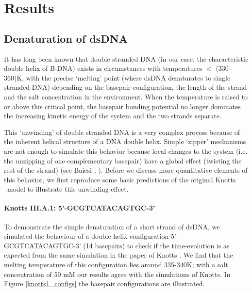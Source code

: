 \section{Results}

\subsection{Denaturation of dsDNA}

It has long been known that double stranded DNA (in our case, the characteristic double helix of B-DNA) exists in circumstances with temperatures $<$ (330--360)K, with the precise `melting' point (where dsDNA denaturates to single stranded DNA) depending on the basepair configuration, the length of the strand and the salt concentration in the environment. When the temperature is raised to or above this critical point, the basepair bonding potential no longer dominates the increasing kinetic energy of the system and the two strands separate. 

This `unwinding' of double stranded DNA is a very complex process because of the inherent helical structure of a DNA double helix. Simple `zipper' mechanisms are not enough to simulate this behavior because local changes to the system (i.e. the unzipping of one complementary basepair) have a global effect (twisting the rest of the strand) (see Baiesi \etal, \cite{carlon2010unwinding}). Before we discuss more quantitative elements of this behavior, we first reproduce some basic predictions of the original Knotts \etal\ model \cite{knotts2007coarse} to illustrate this unwinding effect.

\paragraph{Knotts III.A.1: 5'-GCGTCATACAGTGC-3'} To demonstrate the simple denaturation of a short strand of dsDNA, we simulated the behaviour of a double helix configuration 5'-GCGTCATACAGTGC-3' (14 basepairs) to check if the time-evolution is as expected from the same simulation in the paper of Knotts \etal \cite{knotts2007coarse}. We find that the melting temperature of this configuration lies around 335-340K; with a salt concentration of 50 mM our results agree with the simulations of Knotts. In Figure \ref{knotts1_configs}  the basepair configurations are illustrated.

